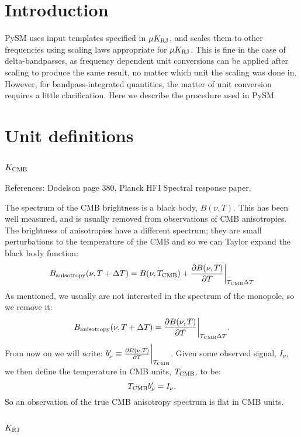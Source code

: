 \documentclass[12pt]{article}
\begin{document}
\maketitle

\section{Introduction}

PySM uses input templates specified in $\mu K_{\rm RJ}$, and scales them to other
frequencies using scaling laws appropriate for $\mu K_{\rm RJ}$. This is fine in
the case of delta-bandpasses, as frequency dependent unit conversions can be
applied after scaling to produce the same result, no matter which unit the
scaling was done in. However, for bandpass-integrated quantities, the matter of
unit conversion requires a little clarification. Here we describe the procedure
used in PySM.

\section{Unit definitions}

\subsection{$K_{\rm CMB}$}

References: Dodelson page 380, Planck HFI Spectral response paper. 

The spectrum of the CMB brightness is a black body, $B(\nu, T)$. This has been well measured,
and is usually removed from observations of CMB anisotropies. The brightness of anisotropies
have a different spectrum; they are small perturbations to the temperature of
the CMB and so we can Taylor expand the black body function:
\[
B_{\rm anisotropy}(\nu, T + \Delta T) = B(\nu, T_{\rm CMB}) + \frac{\partial B(\nu, T)}{\partial T}
\bigg\rvert_{T_{\rm CMB}\Delta T}
\]
As mentioned, we usually are not interested in the spectrum of the monopole,
so we remove it:
\[
B_{\rm anisotropy}(\nu, T+\Delta T) = \frac{\partial B(\nu, T)}{\partial T}\bigg\rvert_{T_{\rm CMB}
  \Delta T}.
\]
From now on we will write: $b^\prime_\nu \equiv \frac{\partial B(\nu, T)}{\partial T}\bigg\rvert_{T_{\rm CMB}}$.
Given some observed signal, $I_\nu$, we then define the temperature in CMB units, $T_{\rm CMB}$, to be:
\[
T_{\rm CMB} b^\prime_\nu = I_\nu.   
\]
So an observation of the true CMB anisotropy spectrum is flat in CMB units.

\subsection{$K_{\rm RJ}$}
\end{document}
